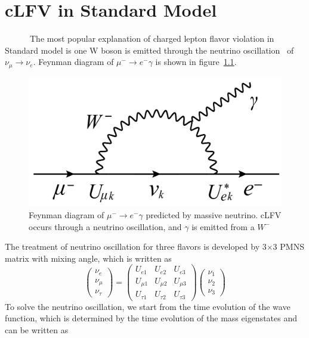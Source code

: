 \chapter{cLFV in Standard Model}
~~~~~~The most popular explanation of charged lepton flavor violation in Standard model is one W boson is emitted through the neutrino oscillation~\cite{t2k} of $\nu_\mu \rightarrow \nu_e$.
Feynman diagram of $\mu^- \rightarrow e^-\gamma$ is shown in figure~\ref{muefy}.
\begin{figure}[H]
 \centering
 \includegraphics[scale=0.27]{chapter1/fig/SMmue.pdf}
 \caption{Feynman diagram of $\mu^- \rightarrow e^-\gamma$ predicted by massive neutrino. cLFV occurs through a neutrino oscillation, and $\gamma$ is emitted from a $W^-$}
 \label{muefy}
\end{figure}
The treatment of neutrino oscillation for three flavors is developed by 3$\times$3 PMNS matrix with mixing angle, which is written as
\begin{equation}
 \begin{pmatrix}
  \nu_e \\
  \nu_\mu \\
  \nu_\tau
 \end{pmatrix} = \begin{pmatrix}
  U_{e1} & U_{e2} & U_{e3} \\
  U_{\mu1} & U_{\mu2} & U_{\mu3} \\
  U_{\tau1} & U_{\tau2} & U_{\tau3}
 \end{pmatrix} \begin{pmatrix}
  \nu_1 \\
  \nu_2 \\
  \nu_3
 \end{pmatrix}
\end{equation}
To solve the neutrino oscillation, we start from the time evolution of the wave function, which is determined by the time evolution of the mass eigenstates and can be written as
